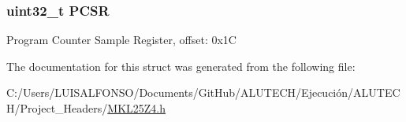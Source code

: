 \subsubsection[{P\+C\+S\+R}]{\setlength{\rightskip}{0pt plus 5cm}uint32\+\_\+t P\+C\+S\+R}\label{struct_d_w_t___mem_map_a631b6ac4a2a7ea845ce82f685d1e0d97}
Program Counter Sample Register, offset\+: 0x1\+C 

The documentation for this struct was generated from the following file\+:\begin{DoxyCompactItemize}
\item 
C\+:/\+Users/\+L\+U\+I\+S\+A\+L\+F\+O\+N\+S\+O/\+Documents/\+Git\+Hub/\+A\+L\+U\+T\+E\+C\+H/\+Ejecución/\+A\+L\+U\+T\+E\+C\+H/\+Project\+\_\+\+Headers/\hyperlink{_m_k_l25_z4_8h}{M\+K\+L25\+Z4.\+h}\end{DoxyCompactItemize}
